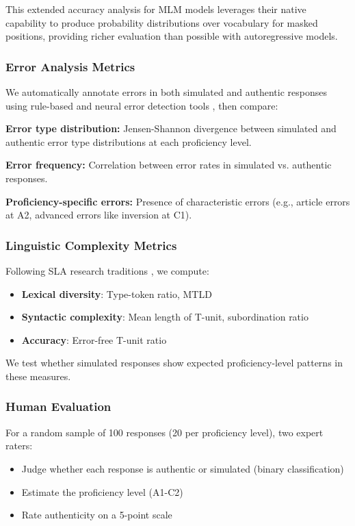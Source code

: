 This extended accuracy analysis for MLM models leverages their native capability to produce probability distributions over vocabulary for masked positions, providing richer evaluation than possible with autoregressive models.

\subsubsection{Error Analysis Metrics}

We automatically annotate errors in both simulated and authentic responses using rule-based and neural error detection tools \cite{bryant2023grammatical}, then compare:

\textbf{Error type distribution:} Jensen-Shannon divergence between simulated and authentic error type distributions at each proficiency level.

\textbf{Error frequency:} Correlation between error rates in simulated vs. authentic responses.

\textbf{Proficiency-specific errors:} Presence of characteristic errors (e.g., article errors at A2, advanced errors like inversion at C1).

\subsubsection{Linguistic Complexity Metrics}

Following SLA research traditions \cite{housen2012complexity}, we compute:

\begin{itemize}
    \item \textbf{Lexical diversity}: Type-token ratio, MTLD
    \item \textbf{Syntactic complexity}: Mean length of T-unit, subordination ratio
    \item \textbf{Accuracy}: Error-free T-unit ratio
\end{itemize}

We test whether simulated responses show expected proficiency-level patterns in these measures.

\subsubsection{Human Evaluation}

For a random sample of 100 responses (20 per proficiency level), two expert raters:
\begin{itemize}
    \item Judge whether each response is authentic or simulated (binary classification)
    \item Estimate the proficiency level (A1-C2)
    \item Rate authenticity on a 5-point scale
\end{itemize}

